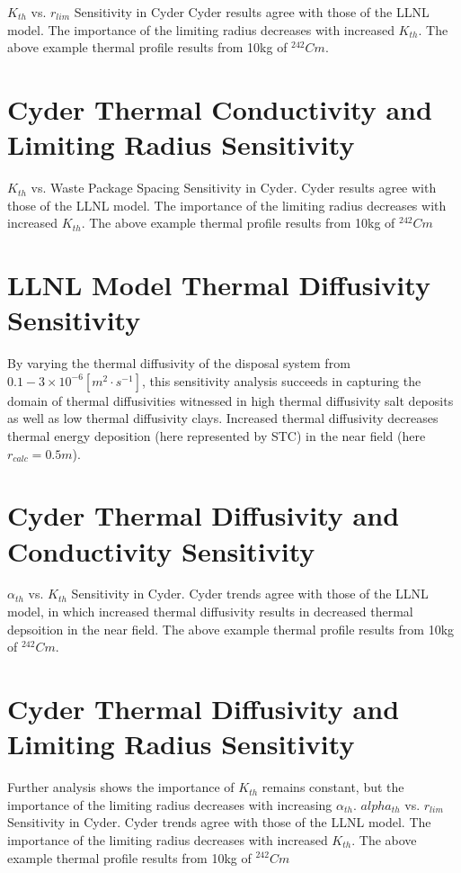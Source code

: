 \documentclass[letterpaper]{article}
\begin{document}
\begin{frame}[ctb!]
$K_{th}$ vs. $r_{lim}$ Sensitivity in Cyder
Cyder results agree with 
those of the LLNL model. The importance of the limiting radius decreases with 
increased $K_{th}$. The above example thermal profile results from 10kg of 
$^{242}Cm$.

\section*{Cyder Thermal Conductivity and Limiting Radius Sensitivity}

$K_{th}$ vs. Waste Package Spacing Sensitivity in Cyder.
Cyder results 
agree with 
those of the LLNL model. The importance of the limiting radius decreases with 
increased $K_{th}$. The above example thermal profile results from 10kg of 
$^{242}Cm$




\section*{LLNL Model Thermal Diffusivity Sensitivity}
  By varying the thermal diffusivity of the disposal system from $0.1-3\times 
  10^{-6} [m^2\cdot s^{-1}]$, this sensitivity analysis succeeds in capturing 
  the domain of 
  thermal diffusivities witnessed in high thermal diffusivity salt deposits as 
  well as low thermal diffusivity clays.
    Increased thermal diffusivity decreases thermal energy deposition (here represented by STC) in the near field (here $r_{calc} = 0.5m$).


\section*{Cyder Thermal Diffusivity and Conductivity Sensitivity}
$\alpha_{th}$ vs. $K_{th}$ Sensitivity in Cyder. Cyder trends agree
  with those of the LLNL model, in which increased thermal diffusivity results 
  in 
  decreased thermal depsoition in the near field. The above example thermal 
  profile results from 10kg of $^{242}Cm$.

\section*{Cyder Thermal Diffusivity and Limiting Radius Sensitivity}
  Further \Cyder analysis shows the importance of $K_{th}$ remains constant, 
  but 
  the importance of the limiting radius decreases with increasing 
  $\alpha_{th}$.
  $alpha_{th}$ vs. $r_{lim}$ Sensitivity in Cyder.
  Cyder trends agree with 
  those of the LLNL model. The importance of the limiting radius decreases with 
  increased $K_{th}$. The above example thermal profile results from 10kg of 
  $^{242}Cm$



\end{frame}
\end{document}
